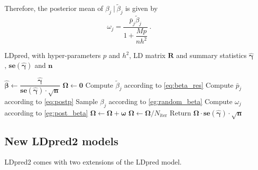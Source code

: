 \documentclass{bioinfo}
\begin{document}
\begin{methods}
Therefore, the posterior mean of $\beta_j ~|~ \tilde{\beta}_j$ is given by 
\begin{equation}\label{eg:post_beta}
\omega_j = \dfrac{\bar{p}_j \tilde{\beta}_j}{1 + \dfrac{M p}{n h^2}} ~.
\end{equation}

\begin{algorithm}[H]
	\caption{LDpred, with hyper-parameters $p$ and $h^2$, LD matrix $\boldsymbol{R}$ and summary statistics $\boldsymbol{\hat{\gamma}}$, $\boldsymbol{\text{se}(\hat{\gamma})}$ and $\boldsymbol{n}$}\label{algo:ldpred}
	\begin{algorithmic}[1]
		\State $\boldsymbol{\hat{\beta}} \gets \dfrac{\boldsymbol{\hat{\gamma}}}{\boldsymbol{\text{se}(\hat{\gamma})} \cdot \sqrt{\boldsymbol{n}}}$ 
		\State $\boldsymbol{\Omega} \gets \boldsymbol{0}$ 
		 
		 
		\State Compute $\tilde{\beta}_j$ according to \eqref{eq:beta_res}
		\State Compute $\bar{p}_j$ according to \eqref{eq:postp}
		\State Sample $\beta_j$ according to \eqref{eg:random_beta}
		\State Compute $\omega_j$ according to \eqref{eg:post_beta}
		\EndFor
		\State $\boldsymbol{\Omega} \gets \boldsymbol{\Omega} + \boldsymbol{\omega}$ 
		\EndIf
		\EndFor
		\State $\boldsymbol{\Omega} \gets \boldsymbol{\Omega} /  N_\text{iter}$ 
		\State Return $\boldsymbol{\Omega} \cdot  \boldsymbol{\text{se}(\hat{\gamma})} \cdot \sqrt{\boldsymbol{n}}$ 
	\end{algorithmic} 
\end{algorithm}


\subsection*{New LDpred2 models}

LDpred2 comes with two extensions of the LDpred model.


\end{methods}
\end{document}
